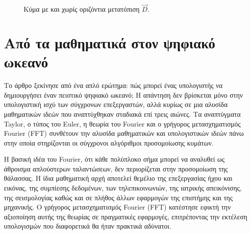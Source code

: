 \documentclass[a4paper, 11pt]{article}
\begin{document}
\begin{figure}[htbp]
\centering
{}
\caption{Κύμα με και χωρίς οριζόντια μετατόπιση $\vec D$.}
\label{fig:choppy_displacement}
\end{figure}

\section{Από τα μαθηματικά στον ψηφιακό
ωκεανό}\label{ux3b1ux3c0ux3cc-ux3c4ux3b1-ux3bcux3b1ux3b8ux3b7ux3bcux3b1ux3c4ux3b9ux3baux3ac-ux3c3ux3c4ux3bfux3bd-ux3c8ux3b7ux3c6ux3b9ux3b1ux3baux3cc-ux3c9ux3baux3b5ux3b1ux3bdux3cc}

Το άρθρο ξεκίνησε από ένα απλό ερώτημα: πώς μπορεί ένας υπολογιστής να
δημιουργήσει έναν πειστικό ψηφιακό ωκεανό; Η απάντηση δεν βρίσκεται μόνο
στην υπολογιστική ισχύ των σύγχρονων επεξεργαστών, αλλά κυρίως σε μια
αλυσίδα μαθηματικών ιδεών που αναπτύχθηκαν σταδιακά επί τρεις αιώνες. Τα
αναπτύγματα Taylor, ο τύπος του Euler, η θεωρία του Fourier και ο
γρήγορος μετασχηματισμός Fourier (FFT) συνθέτουν την αλυσίδα μαθηματικών
και υπολογιστικών ιδεών πάνω στην οποία στηρίζονται οι σύγχρονοι
αλγόριθμοι προσομοίωσης κυμάτων.

Η βασική ιδέα του Fourier, ότι κάθε πολύπλοκο σήμα μπορεί να αναλυθεί ως
άθροισμα απλούστερων ταλαντώσεων, δεν περιορίζεται στην προσομοίωση της
θάλασσας. Η ίδια μαθηματική αρχή αποτελεί θεμέλιο της επεξεργασίας ήχου
και εικόνας, της συμπίεσης δεδομένων, των τηλεπικοινωνιών, της ιατρικής
απεικόνισης, της σεισμολογίας καθώς και σε πλήθος άλλων εφαρμογών της
επιστήμης και της μηχανικής. Ο γρήγορος μετασχηματισμός Fourier (FFT)
κατέστησε εφικτή την αξιοποίηση αυτής της θεωρίας σε πραγματικές
εφαρμογές, επιτρέποντας την εκτέλεση υπολογισμών που διαφορετικά θα ήταν
πρακτικά αδύνατοι.
\end{document}
